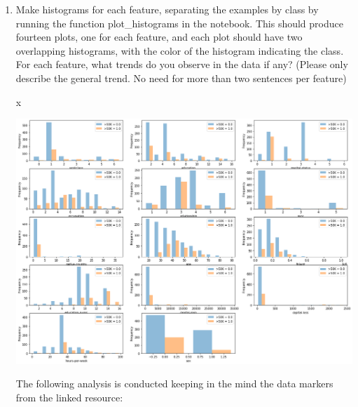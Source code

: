 \begin{enumerate}
\item {} Make histograms for each feature, separating the examples by class by running the function plot\_histograms in the notebook. This should produce fourteen plots, one for each feature, and each plot should have two overlapping histograms, with the color of the histogram indicating the class. For each feature, what trends do you observe in the data if any? (Please only describe the general trend. No need for more than two sentences per feature) 

\sol x

\begin{center}
    \includegraphics[scale=0.36]{5a.png} \\
\end{center}

The following analysis is conducted keeping in the mind the data markers from the linked resource:


\end{enumerate}
